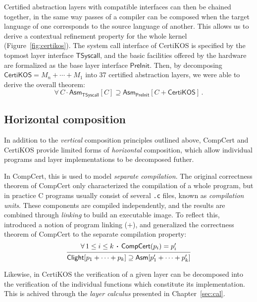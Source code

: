 \documentclass[11pt,oneside,draft]{book}
\theoremstyle{definition}
\newcommand{\kw}[1]{\ensuremath{ \mathsf{#1} }}
\newcommand{\bdot}{\boldsymbol{\cdot}}
\begin{document}
Certified abstraction layers
with compatible interfaces can then be chained together,
in the same way passes of a compiler
can be composed when the target language of one
corresponds to the source language of another.
This allows us to derive a contextual refinement property
for the whole kernel (Figure~\ref{fig:certikos}).
The system call interface of CertiKOS is specified
by the topmost layer interface $\kw{TSyscall}$,
and the basic facilities offered by the hardware
are formalized as the base layer interface $\kw{PreInit}$.
Then, by decomposing $\kw{CertiKOS} = M_n + \cdots + M_1$
into 37 certified abstraction layers,
we were able to derive the overall theorem:
\[
  \forall \, C \, \bdot \,
    \kw{Asm}_{\kw{TSyscall}}[C]
    \supseteq
    \kw{Asm}_{\kw{PreInit}}[C + \kw{CertiKOS}] \,.
\]


\subsection{Horizontal composition} %

In addition to
the \emph{vertical} composition principles outlined above,
CompCert and CertiKOS provide limited forms of
\emph{horizontal} composition,
which allow individual programs and layer implementations
to be decomposed futher.

In CompCert,
this is used to model \emph{separate compilation}.
The original correctness theorem of CompCert
only characterized the compilation of a whole program,
but in practice C programs usually consist of
several \texttt{.c} files, known as \emph{compilation units}.
These components are compiled independently,
and the results are combined through \emph{linking} to build
an executable image.
To reflect this,
\citet{sepcompcert}
introduced a notion of program linking ($+$), and
generalized the correctness theorem of CompCert
to the separate compilation property:
\[
  \begin{prooftree}
    \hypo{\forall \, 1 \le i \le k \, \bdot \,
      \kw{CompCert}(p_i) = p_i'}
    \infer1{\kw{Clight}[p_1 + \cdots + p_k] \supseteq
      \kw{Asm}[p_1' + \cdots + p_k']}
  \end{prooftree}
\]

Likewise,
in CertiKOS the verification of a given layer
can be decomposed into
the verification of the individual functions
which constitute its implementation.
This is achived through the \emph{layer calculus}
presented in Chapter~\ref{sec:cal}.
\end{document}
